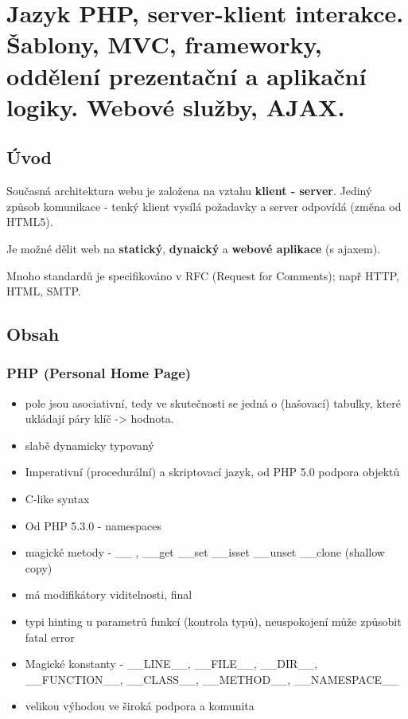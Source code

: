 \documentclass{scrreprt}
\begin{document}
\setcounter{chapter}{12}
\chapter{Jazyk PHP, server-klient interakce. Šablony, MVC, frameworky, oddělení prezentační a aplikační logiky. Webové služby, AJAX.}

\section{Úvod}
Současná architektura webu je založena na vztahu \textbf{klient - server}. Jediný způsob komunikace - tenký klient vysílá požadavky a server odpovídá
(změna od HTML5). 

Je možné dělit web na \textbf{statický}, \textbf{dynaický} a \textbf{webové aplikace} (s ajaxem).

Mnoho standardů je specifikováno v RFC (Request for Comments); např HTTP, HTML, SMTP. 

\section{Obsah}

\subsection{PHP (Personal Home Page)}
\begin{itemize}
  \item pole jsou asociativní, tedy ve skutečnosti se jedná o (hašovací) tabulky, které ukládají páry klíč -> hodnota.
  \item slabě dynamicky typovaný
  \item Imperativní (procedurální) a skriptovací jazyk, od PHP 5.0 podpora objektů
  \item C-like syntax
  \item Od PHP 5.3.0 - namespaces
  \item magické metody - \_\_ , \_\_get \_\_set \_\_isset \_\_unset \_\_clone (shallow copy)
  \item má modifikátory viditelnosti, final
  \item typi hinting u parametrů funkcí (kontrola typů), neuspokojení může způsobit fatal error
  \item Magické konstanty - \_\_LINE\_\_, \_\_FILE\_\_, \_\_DIR\_\_, \_\_FUNCTION\_\_, \_\_CLASS\_\_, \_\_METHOD\_\_, \_\_NAMESPACE\_\_
  \item velikou výhodou ve široká podpora a komunita
\end{itemize}
\end{document}
